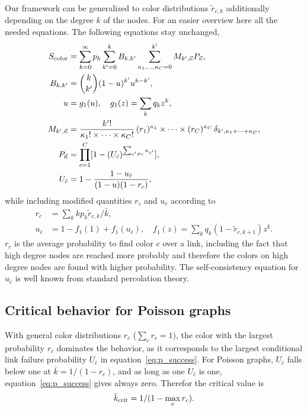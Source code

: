 \documentclass[aps, pre, onecolumn, a4paper, floatfix]{revtex4}
\begin{document}
Our framework can be generalized to color distributions  
${\tilde r}_{c,k}$ additionally depending on the degree $k$ of the nodes. For an easier overview 
here all the needed equations. The following equations stay unchanged, 
\begin{align}
S_{\rm color} &= \sum_{k=0}^{\infty}p_k \sum_{k'=0}^{k} B_{k,k'} 
\sum_{\kappa_1,\dots, \kappa_C=0}^{k'} M_{k',\vec \kappa} 
P_{\vec \kappa},\\
B_{k,k'} &={k \choose k'}(1-u)^{k'}u^{k-k'},\\
u &= g_1(u),\quad g_1(z)=\sum_k q_k z^k,\\
M_{k',\vec \kappa} &=\frac{k'!}{\kappa_1! \times \dots \times \kappa_C!} \,
(r_1)^{\kappa_1} \times \dots \times (r_C)^{\kappa_C}\,
\delta_{k',\kappa_1+\dots + \kappa_C},\\
P_{\vec \kappa} &= \prod_{c=1}^C [1-(U_{\bar c})^{\sum_{c'\neq c} \kappa_{c'} }],\\
U_{\bar c} &= 1 - \frac{1-u_{\bar c}}{(1-u)(1-r_c)},
\end{align}
while including modified quantities $r_c$ and $u_{\bar c}$ according to 
\begin{align}
r_c &= \sum_k k p_k {\tilde r}_{c,k}/{\bar k},\\
u_{\bar c} &= 1- f_1(1) +  f_1(u_{\bar c}),\quad f_1(z)=\sum_k q_k (1-{\tilde r}_{c,k+1}) z^k.
\end{align}
$r_c$ is the average probability to find color $c$ over a link, including the fact that 
high degree nodes are reached more probably and therefore the colors on high degree nodes 
are found with higher probability. The self-consistency equation for $u_{\bar c}$ is 
well known from standard percolation theory. 




\subsection{Critical behavior for Poisson graphs}

With general color distributions $r_c$ ($\sum_c r_c =1$), the color with the largest probability 
$r_c$ dominates 
the behavior, as it corresponds to the largest conditional link failure probability $U_{\bar c}$
in equation~\ref{eq:p_success}. For Poisson graphs, $U_{\bar c}$ 
falls below one at ${\bar k}=1/(1-r_c)$, and as long as one $U_{\bar c}$ is one, equation~\ref{eq:p_success}
gives always zero. Therefor the critical value is 
\begin{align}
{\bar k}_{\rm crit}=1/(1-\max_c r_c).
\end{align}
\end{document}
